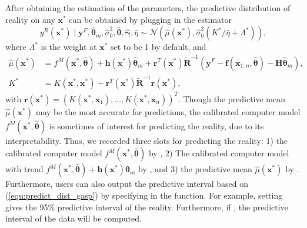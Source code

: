  After obtaining the estimation of the parameters, the predictive distribution of reality on any $\mathbf x^*$ can be obtained by plugging in the estimator 
\begin{equation}
 y^R(\mathbf x^*)\mid \mathbf y^F, \hat{\bm \theta}_m, \hat \sigma^2_0, \hat {\bm \theta}, \hat {\bm \gamma}, \hat \eta \sim \mathcal N( \hat \mu(\mathbf x^*), \hat \sigma^2_0(K^*/\hat \eta+   \Lambda^*) ), 
 \label{equ:predict_dist_gasp}
 \end{equation}
where $ \Lambda^*$ is the weight at $\mathbf x^*$ set to be 1 by default, and  
\begin{align*}
\hat \mu(\mathbf x^*)&=f^M(\mathbf x^*, \hat {\bm \theta} )+\mathbf h(\mathbf x^*) \hat{\bm \theta}_m+ \mathbf r^T(\mathbf x^*)  \tilde {\mathbf R}^{-1}(\mathbf y^F- \mathbf f(\mathbf x_{1:n},\hat {\bm \theta} )-\mathbf H \hat{\bm \theta}_m ), \\
K^*&=K(\mathbf x^*, \mathbf x^*)- \mathbf r^T(\mathbf x^*)  \tilde {\mathbf R}^{-1} \mathbf r(\mathbf x^*), 
  \end{align*}
with  $\mathbf r(\mathbf x^*)=(K(\mathbf x^*, \mathbf x_1),...,K(\mathbf x^*, \mathbf x_n))^T$.  {Though the predictive mean $\hat \mu(\mathbf x^*)$ may be the most accurate for predictions, the  calibrated computer model $f^M(\mathbf x^*, \hat {\bm \theta} )$   is sometimes of interest for predicting the reality, due to its interpretability}. Thus, we recorded three slots for predicting the reality: 1) the calibrated computer model $f^M(\mathbf x^*, \hat {\bm \theta} )$ by , 2) The calibrated computer model with trend $f^M(\mathbf x^*, \hat {\bm \theta} )+\mathbf h(\mathbf x^*) \hat {\bm \theta}_m$  by  , and 3) the predictive mean $\hat \mu(\mathbf x^*)$ by . Furthermore, users can also output the predictive interval based on  (\ref{equ:predict_dist_gasp}) by  specifying   in the  function. For example, setting     gives the 95\% predictive interval of the reality. Furthermore, if , the predictive interval of the data will be computed. 

